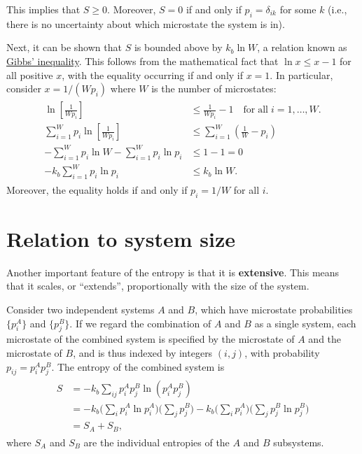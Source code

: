 \documentclass[pra,12pt]{revtex4}
\begin{document}
\noindent
This implies that $S\ge 0$.  Moreover, $S = 0$ if and only if $p_i =
\delta_{ik}$ for some $k$ (i.e., there is no uncertainty about which
microstate the system is in).

Next, it can be shown that $S$ is bounded above by $k_b \ln W$, a
relation known as
\href{https://en.wikipedia.org/wiki/Gibbs\%27_inequality}{Gibbs'
  inequality}.  This follows from the mathematical fact that $\ln x
\le x - 1$ for all positive $x$, with the equality occurring if and
only if $x = 1$.  In particular, consider $x = 1/(Wp_i)$ where $W$ is
the number of microstates:
\begin{align}
  \begin{aligned}
    \ln \left[\frac{1}{Wp_i}\right] &\le \frac{1}{Wp_i} - 1
    \quad \textrm{for}\;\textrm{all}\; i = 1,\dots, W. \\
    \sum_{i=1}^W p_i \ln \left[\frac{1}{Wp_i}\right]
    &\le \sum_{i=1}^W \left(\frac{1}{W} - p_i\right) \\
    - \sum_{i=1}^W p_i \ln W - \sum_{i=1}^W p_i \ln p_i
    &\le 1 - 1 = 0 \\
    - k_b \sum_{i=1}^W p_i \ln p_i &\le k_b \ln W.
  \end{aligned}
\end{align}
Moreover, the equality holds if and only if $p_i = 1/W$ for all $i$.

\section{Relation to system size}

Another important feature of the entropy is that it is
\textbf{extensive}.  This means that it scales, or ``extends'',
proportionally with the size of the system.

Consider two independent systems $A$ and $B$, which have microstate
probabilities $\{p_i^A\}$ and $\{p_j^B\}$.  If we regard the
combination of $A$ and $B$ as a single system, each microstate of the
combined system is specified by the microstate of $A$ and the
microstate of $B$, and is thus indexed by integers $(i,j)$, with
probability $p_{ij} = p^A_ip^B_j$.  The entropy of the combined system
is
\begin{align}
  \begin{aligned}
    S &= - k_b \sum_{ij} p_i^Ap^B_j \ln\left(p^A_ip^B_j\right) \\
    &= - k_b \Big(\sum_{i} p^A_i \ln p^A_i\Big)\Big(\sum_j p^B_j\Big)
    - k_b \Big(\sum_{i} p^A_i \Big) \Big(\sum_j p^B_j \ln p^B_j\Big) \\
    &= S_A + S_B,
  \end{aligned}
\end{align}
where $S_A$ and $S_B$ are the individual entropies of the $A$ and $B$
subsystems.
\end{document}
